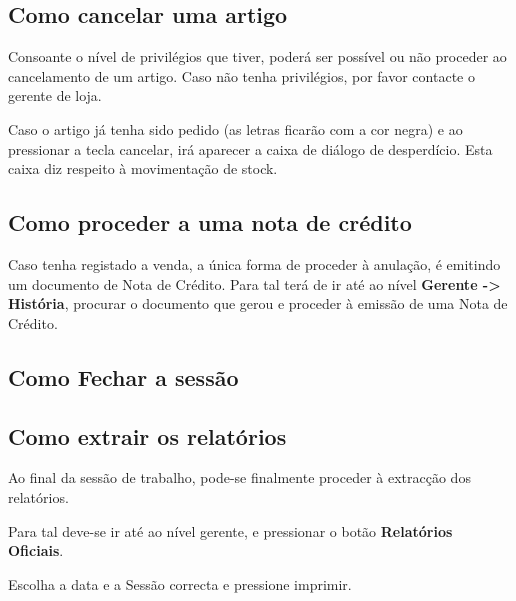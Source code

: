 \subsection{Como cancelar uma artigo}

Consoante o nível de privilégios que tiver, poderá ser possível ou não proceder ao cancelamento de um artigo. Caso não tenha privilégios, por favor contacte o gerente de loja.

Caso o artigo já tenha sido pedido (as letras ficarão com a cor negra) e ao pressionar a tecla cancelar, irá aparecer a caixa de diálogo de desperdício. Esta caixa diz respeito à movimentação de stock.

\subsection{Como proceder a uma nota de crédito}

Caso tenha registado a venda, a única forma de proceder à anulação, é emitindo um documento de Nota de Crédito.
Para tal terá de ir até ao nível \textbf{Gerente -> História}, procurar o documento que gerou e proceder à emissão de uma Nota de Crédito.


\subsection{Como Fechar a sessão}

\subsection{Como extrair os relatórios}

Ao final da sessão de trabalho, pode-se finalmente proceder à extracção dos relatórios.

Para tal deve-se ir até ao nível gerente, e pressionar o botão \textbf{Relatórios Oficiais}.

Escolha a data e a Sessão correcta e pressione imprimir. 